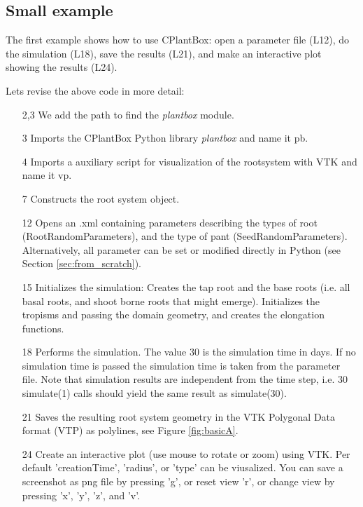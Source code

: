\newpage

\subsection{Small example}

The first example shows how to use CPlantBox: open a parameter file (L12), do the simulation (L18), 
save the results (L21), and make an interactive plot showing the results (L24). 

 

\noindent 
Lets revise the above code in more detail: 
\begin{itemize}
 \item[2,3] We add the path to find the \emph{plantbox} module.
 \item[3] Imports the CPlantBox Python library \emph{plantbox} and name it pb.
 \item[4] Imports a auxiliary script for visualization of the rootsystem with VTK and name it vp.
 \item[7] Constructs the root system object.
 \item[12] Opens an .xml containing parameters describing the types of root (RootRandomParameters), 
 and the type of pant (SeedRandomParameters). Alternatively, all parameter can be set or modified directly in Python 
 (see Section \ref{sec:from_scratch}).
 \item[15] Initializes the simulation: Creates the tap root and the base roots
 (i.e. all basal roots, and shoot borne roots that might emerge). Initializes the tropisms and passing the domain geometry, 
 and creates the elongation functions. 
 \item[18] Performs the simulation. The value 30 is the simulation time in days. 
 If no simulation time is passed the simulation time is taken from the parameter file. 
 Note that simulation results are independent from the time step, i.e. 30 simulate(1) calls should yield the same result 
 as simulate(30). 
 \item[21] Saves the resulting root system geometry in the VTK Polygonal Data format (VTP) as polylines, 
 see Figure \ref{fig:basicA}. 
 \item[24] Create an interactive plot (use mouse to rotate or zoom) using VTK. 
 Per default 'creationTime', 'radius', or 'type' can be viusalized.
 You can save a screenshot as png file by pressing 'g', or reset view 'r', or change view by pressing 'x', 'y', 'z', and 'v'.
 \end{itemize}
  
